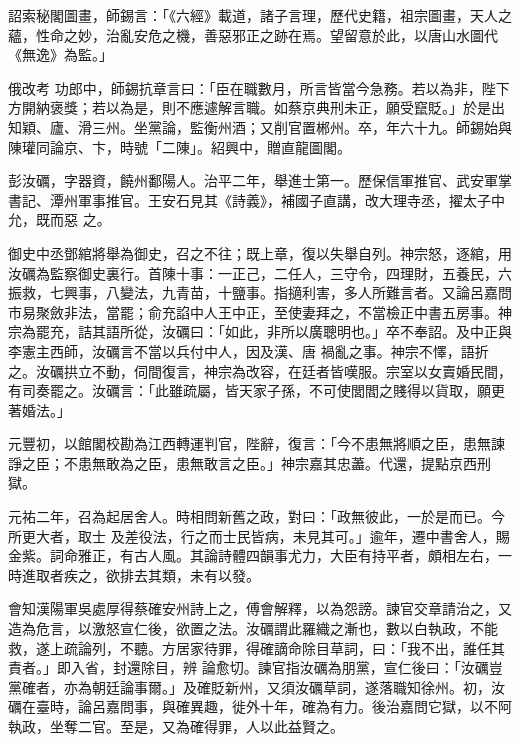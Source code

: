 \begin{pinyinscope}
 詔索秘閣圖畫，師錫言：「《六經》載道，諸子言理，歷代史籍，祖宗圖畫，天人之蘊，性命之妙，治亂安危之機，善惡邪正之跡在焉。望留意於此，以唐山水圖代《無逸》為監。」



 俄改考
 功郎中，師錫抗章言曰：「臣在職數月，所言皆當今急務。若以為非，陛下方開納褒獎；若以為是，則不應遽解言職。如蔡京典刑未正，願受竄貶。」於是出知穎、廬、滑三州。坐黨論，監衡州酒；又削官置郴州。卒，年六十九。師錫始與陳瓘同論京、卞，時號「二陳」。紹興中，贈直龍圖閣。



 彭汝礪，字器資，饒州鄱陽人。治平二年，舉進士第一。歷保信軍推官、武安軍掌書記、潭州軍事推官。王安石見其《詩義》，補國子直講，改大理寺丞，擢太子中允，既而惡
 之。



 御史中丞鄧綰將舉為御史，召之不往；既上章，復以失舉自列。神宗怒，逐綰，用汝礪為監察御史裏行。首陳十事：一正己，二任人，三守令，四理財，五養民，六振救，七興事，八變法，九青苗，十鹽事。指擿利害，多人所難言者。又論呂嘉問市易聚斂非法，當罷；俞充諂中人王中正，至使妻拜之，不當檢正中書五房事。神宗為罷充，詰其語所從，汝礪曰：「如此，非所以廣聰明也。」卒不奉詔。及中正與李憲主西師，汝礪言不當以兵付中人，因及漢、唐
 禍亂之事。神宗不懌，語折之。汝礪拱立不動，伺間復言，神宗為改容，在廷者皆嘆服。宗室以女賣婚民間，有司奏罷之。汝礪言：「此雖疏屬，皆天家子孫，不可使閭閻之賤得以貨取，願更著婚法。」



 元豐初，以館閣校勘為江西轉運判官，陛辭，復言：「今不患無將順之臣，患無諫諍之臣；不患無敢為之臣，患無敢言之臣。」神宗嘉其忠藎。代還，提點京西刑獄。



 元祐二年，召為起居舍人。時相問新舊之政，對曰：「政無彼此，一於是而已。今所更大者，取士
 及差役法，行之而士民皆病，未見其可。」逾年，遷中書舍人，賜金紫。詞命雅正，有古人風。其論詩體四韻事尤力，大臣有持平者，頗相左右，一時進取者疾之，欲排去其類，未有以發。



 會知漢陽軍吳處厚得蔡確安州詩上之，傅會解釋，以為怨謗。諫官交章請治之，又造為危言，以激怒宣仁後，欲置之法。汝礪謂此羅織之漸也，數以白執政，不能救，遂上疏論列，不聽。方居家待罪，得確謫命除目草詞，曰：「我不出，誰任其責者。」即入省，封還除目，辨
 論愈切。諫官指汝礪為朋黨，宣仁後曰：「汝礪豈黨確者，亦為朝廷論事爾。」及確貶新州，又須汝礪草詞，遂落職知徐州。初，汝礪在臺時，論呂嘉問事，與確異趣，徙外十年，確為有力。後治嘉問它獄，以不阿執政，坐奪二官。至是，又為確得罪，人以此益賢之。




\end{pinyinscope}
